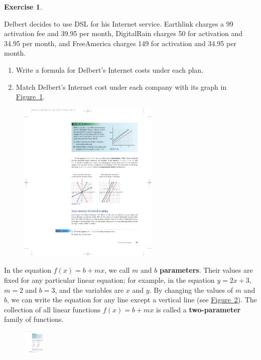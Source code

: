 \documentclass[10pt,]{book}
\newcommand{\terminology}[1]{\textbf{#1}}
\theoremstyle{plain}
\theoremstyle{definition}
\theoremstyle{definition}
\theoremstyle{definition}
\theoremstyle{definition}
\theoremstyle{definition}
\newtheorem{exercise}[theorem]{Exercise}
\numberwithin{equation}{section}
\begin{document}
\begin{exercise}\label{exercise-dsl-price}

Delbert decides to use DSL for his Internet service. Earthlink charges a \textdollar{}99 activation fee and \textdollar{}39.95 per month, DigitalRain charges \textdollar{}50 for activation and \textdollar{}34.95 per month, and FreeAmerica charges \textdollar{}149 for activation and \textdollar{}34.95 per month.
\leavevmode%
\begin{enumerate}[label=*\alph**]
\item\hypertarget{li-160}{}Write a formula for Delbert's Internet costs under each plan.
    \item\hypertarget{li-161}{}Match Delbert's Internet cost under each company with its graph in \hyperref[fig-dsl-price]{Figure~\ref{fig-dsl-price}}.
    \end{enumerate}
\leavevmode%
\begin{figure}
\centering
\includegraphics[width=0.60\textwidth,]{images/fig-dsl-price.pdf}\caption{\label{fig-dsl-price}}
\end{figure}
\end{exercise}
\par

    In the equation \(f (x) = b + mx\), we call \(m\) and \(b\) \terminology{parameters}. Their values are fixed for any particular linear equation; for example, in the equation \(y = 2x + 3\), \(m = 2\) and \(b = 3\), and the variables are \(x\) and \(y\). By changing the values of \(m\) and \(b\), we can write the equation for any line except a vertical line (see \hyperref[fig-slope-vs-intercept]{Figure~\ref{fig-slope-vs-intercept}}). The collection of all linear functions \(f (x) = b + mx\) is called a \terminology{two-parameter} family of functions.
%
\leavevmode%
\begin{figure}
\centering
\includegraphics[width=0.100\textwidth,]{images/fig-slope-vs-intercept.pdf}\caption{\label{fig-slope-vs-intercept}}
\end{figure}
\typeout{************************************************}
\typeout{************************************************}
\end{document}

